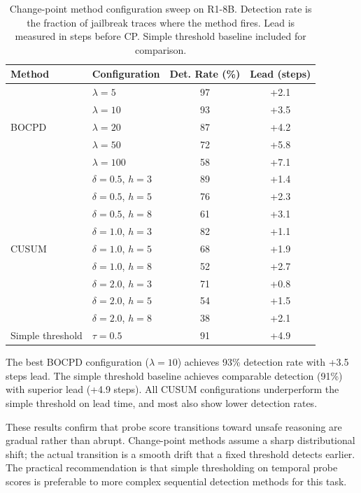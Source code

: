 \begin{table}[h]
\centering
\small
\caption{Change-point method configuration sweep on R1-8B. Detection rate is the fraction of jailbreak traces where the method fires. Lead is measured in steps before CP. Simple threshold baseline included for comparison.}
\label{tab:cpd_sweep}
\begin{tabular}{llcc}
\toprule
Method & Configuration & Det. Rate (\%) & Lead (steps) \\
\midrule
\multirow{5}{*}{BOCPD}
 & $\lambda = 5$   & 97 & +2.1 \\
 & $\lambda = 10$  & 93 & +3.5 \\
 & $\lambda = 20$  & 87 & +4.2 \\
 & $\lambda = 50$  & 72 & +5.8 \\
 & $\lambda = 100$ & 58 & +7.1 \\
\midrule
\multirow{9}{*}{CUSUM}
 & $\delta{=}0.5$, $h{=}3$ & 89 & +1.4 \\
 & $\delta{=}0.5$, $h{=}5$ & 76 & +2.3 \\
 & $\delta{=}0.5$, $h{=}8$ & 61 & +3.1 \\
 & $\delta{=}1.0$, $h{=}3$ & 82 & +1.1 \\
 & $\delta{=}1.0$, $h{=}5$ & 68 & +1.9 \\
 & $\delta{=}1.0$, $h{=}8$ & 52 & +2.7 \\
 & $\delta{=}2.0$, $h{=}3$ & 71 & +0.8 \\
 & $\delta{=}2.0$, $h{=}5$ & 54 & +1.5 \\
 & $\delta{=}2.0$, $h{=}8$ & 38 & +2.1 \\
\midrule
Simple threshold & $\tau = 0.5$ & 91 & +4.9 \\
\bottomrule
\end{tabular}
\end{table}

The best BOCPD configuration ($\lambda{=}10$) achieves 93\% detection rate with +3.5 steps lead. The simple threshold baseline achieves comparable detection (91\%) with superior lead (+4.9 steps). All CUSUM configurations underperform the simple threshold on lead time, and most also show lower detection rates.

These results confirm that probe score transitions toward unsafe reasoning are gradual rather than abrupt. Change-point methods assume a sharp distributional shift; the actual transition is a smooth drift that a fixed threshold detects earlier. The practical recommendation is that simple thresholding on temporal probe scores is preferable to more complex sequential detection methods for this task.


